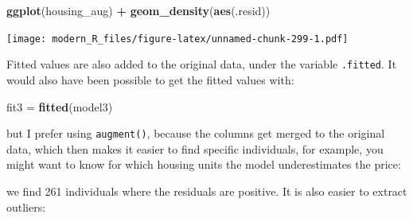 \documentclass[]{gitbook}
\newenvironment{Shaded}{\begin{snugshade}}{\end{snugshade}}
\newcommand{\DataTypeTok}[1]{\textcolor[rgb]{0.13,0.29,0.53}{#1}}
\newcommand{\DecValTok}[1]{\textcolor[rgb]{0.00,0.00,0.81}{#1}}
\newcommand{\FloatTok}[1]{\textcolor[rgb]{0.00,0.00,0.81}{#1}}
\newcommand{\KeywordTok}[1]{\textcolor[rgb]{0.13,0.29,0.53}{\textbf{#1}}}
\newcommand{\NormalTok}[1]{#1}
\newcommand{\OperatorTok}[1]{\textcolor[rgb]{0.81,0.36,0.00}{\textbf{#1}}}
\newcommand{\StringTok}[1]{\textcolor[rgb]{0.31,0.60,0.02}{#1}}
\theoremstyle{definition}
\theoremstyle{definition}
\theoremstyle{definition}
\theoremstyle{remark}
\begin{document}
\begin{Shaded}
\begin{Highlighting}[]
\KeywordTok{ggplot}\NormalTok{(housing_aug) }\OperatorTok{+}
\StringTok{  }\KeywordTok{geom_density}\NormalTok{(}\KeywordTok{aes}\NormalTok{(.resid))}
\end{Highlighting}
\end{Shaded}

\texttt{[image: modern\_R\_files/figure-latex/unnamed-chunk-299-1.pdf]}

Fitted values are also added to the original data, under the variable
\texttt{.fitted}. It would also have been possible to get the fitted
values with:

\begin{Shaded}
\begin{Highlighting}[]
\NormalTok{fit3 =}\StringTok{ }\KeywordTok{fitted}\NormalTok{(model3)}
\end{Highlighting}
\end{Shaded}

but I prefer using \texttt{augment()}, because the columns get merged to
the original data, which then makes it easier to find specific
individuals, for example, you might want to know for which housing units
the model underestimates the price:

\begin{Shaded}
\end{Shaded}

we find 261 individuals where the residuals are positive. It is also
easier to extract outliers:

\begin{Shaded}
\end{Shaded}
\end{document}
